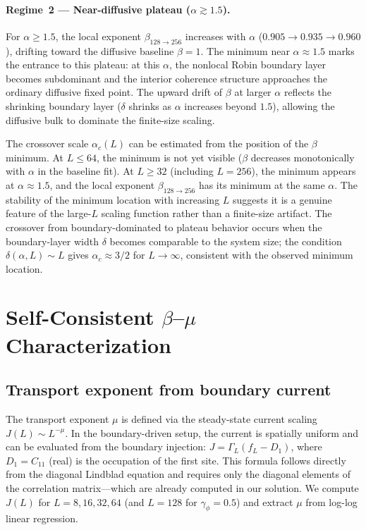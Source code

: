 \documentclass[aps,prb,twocolumn,superscriptaddress,floatfix]{revtex4-2}
\begin{document}
\paragraph{Regime~2 --- Near-diffusive plateau ($\alpha \gtrsim 1.5$).}
For $\alpha \ge 1.5$, the local exponent $\beta_{128 \to 256}$ increases with $\alpha$ ($0.905 \to 0.935 \to 0.960$), drifting toward the diffusive baseline $\beta = 1$. The minimum near $\alpha \approx 1.5$ marks the entrance to this plateau: at this $\alpha$, the nonlocal Robin boundary layer becomes subdominant and the interior coherence structure approaches the ordinary diffusive fixed point. The upward drift of $\beta$ at larger $\alpha$ reflects the shrinking boundary layer ($\delta$ shrinks as $\alpha$ increases beyond $1.5$), allowing the diffusive bulk to dominate the finite-size scaling.

The crossover scale $\alpha_c(L)$ can be estimated from the position of the $\beta$ minimum. At $L \le 64$, the minimum is not yet visible ($\beta$ decreases monotonically with $\alpha$ in the baseline fit). At $L \ge 32$ (including $L = 256$), the minimum appears at $\alpha \approx 1.5$, and the local exponent $\beta_{128 \to 256}$ has its minimum at the same $\alpha$. The stability of the minimum location with increasing $L$ suggests it is a genuine feature of the large-$L$ scaling function rather than a finite-size artifact. The crossover from boundary-dominated to plateau behavior occurs when the boundary-layer width $\delta$ becomes comparable to the system size; the condition $\delta(\alpha, L) \sim L$ gives $\alpha_c \approx 3/2$ for $L \to \infty$, consistent with the observed minimum location.

\section{Self-Consistent $\beta$--$\mu$ Characterization}
\label{sec:beta_mu}

\subsection{Transport exponent from boundary current}
\label{sec:mu}

The transport exponent $\mu$ is defined via the steady-state current scaling $J(L) \sim L^{-\mu}$. In the boundary-driven setup, the current is spatially uniform and can be evaluated from the boundary injection: $J = \Gamma_L (f_L - D_1)$, where $D_1 = C_{11}$ (real) is the occupation of the first site. This formula follows directly from the diagonal Lindblad equation and requires only the diagonal elements of the correlation matrix---which are already computed in our solution. We compute $J(L)$ for $L = 8, 16, 32, 64$ (and $L = 128$ for $\gamma_\phi = 0.5$) and extract $\mu$ from log-log linear regression.
\end{document}
